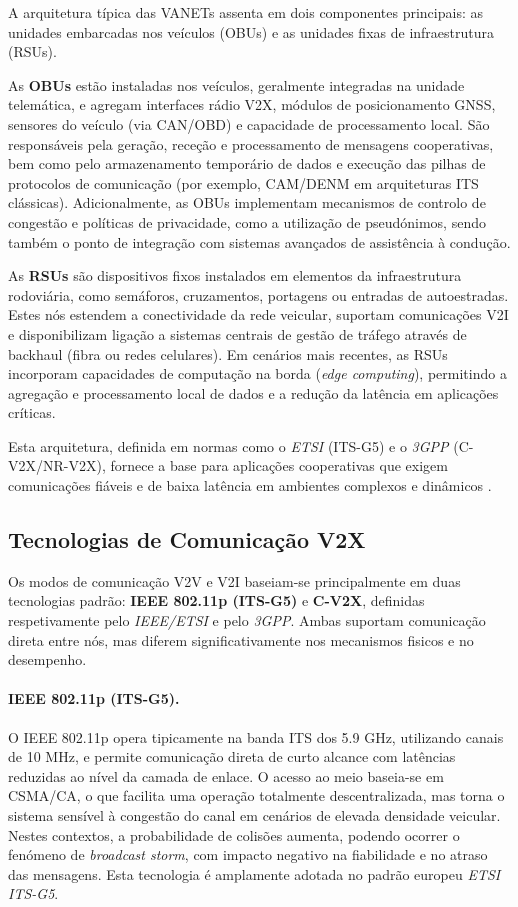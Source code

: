 A arquitetura típica das \gls{VANETs} assenta em dois componentes principais: as unidades embarcadas nos veículos (\gls{OBUs}) e as unidades fixas de infraestrutura (\gls{RSUs}).

As \textbf{\gls{OBUs}} estão instaladas nos veículos, geralmente integradas na unidade telemática, e agregam interfaces rádio V2X, módulos de posicionamento GNSS, sensores do veículo (via CAN/OBD) e capacidade de processamento local. São responsáveis pela geração, receção e processamento de mensagens cooperativas, bem como pelo armazenamento temporário de dados e execução das pilhas de protocolos de comunicação (por exemplo, CAM/DENM em arquiteturas ITS clássicas). Adicionalmente, as OBUs implementam mecanismos de controlo de congestão e políticas de privacidade, como a utilização de pseudónimos, sendo também o ponto de integração com sistemas avançados de assistência à condução.

As \textbf{\gls{RSUs}} são dispositivos fixos instalados em elementos da infraestrutura rodoviária, como semáforos, cruzamentos, portagens ou entradas de autoestradas. Estes nós estendem a conectividade da rede veicular, suportam comunicações \gls{V2I} e disponibilizam ligação a sistemas centrais de gestão de tráfego através de backhaul (fibra ou redes celulares). Em cenários mais recentes, as RSUs incorporam capacidades de computação na borda (\textit{edge computing}), permitindo a agregação e processamento local de dados e a redução da latência em aplicações críticas.

Esta arquitetura, definida em normas como o \textit{ETSI} (ITS-G5) e o \textit{3GPP} (C-V2X/NR-V2X), fornece a base para aplicações cooperativas que exigem comunicações fiáveis e de baixa latência em ambientes complexos e dinâmicos \cite{gerla_internet_2014}.

\subsection{Tecnologias de Comunicação V2X}
\label{sec:tecnologias_v2x}

Os modos de comunicação \gls{V2V} e \gls{V2I} baseiam-se principalmente em duas tecnologias padrão: \textbf{IEEE 802.11p (ITS-G5)} e \textbf{C-V2X}, definidas respetivamente pelo \textit{IEEE/ETSI} e pelo \textit{3GPP}. Ambas suportam comunicação direta entre nós, mas diferem significativamente nos mecanismos fisicos e no desempenho.

\paragraph{IEEE 802.11p (ITS-G5).}
O IEEE 802.11p opera tipicamente na banda ITS dos 5.9 GHz, utilizando canais de 10 MHz, e permite comunicação direta de curto alcance com latências reduzidas ao nível da camada de enlace. O acesso ao meio baseia-se em CSMA/CA, o que facilita uma operação totalmente descentralizada, mas torna o sistema sensível à congestão do canal em cenários de elevada densidade veicular. Nestes contextos, a probabilidade de colisões aumenta, podendo ocorrer o fenómeno de \textit{broadcast storm}, com impacto negativo na fiabilidade e no atraso das mensagens. Esta tecnologia é amplamente adotada no padrão europeu \textit{ETSI ITS-G5}.

